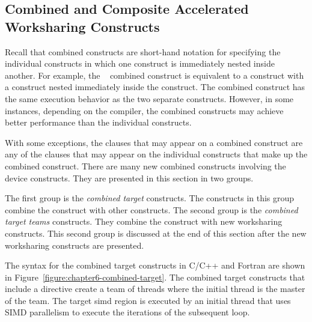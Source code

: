 \subsection{Combined and Composite Accelerated Worksharing Constructs}
\label{ssec:06.composite-worksharing-loop-construct}

Recall that combined constructs are short-hand notation for specifying the
individual constructs in which one construct is immediately nested inside another.
For example, the ~ combined construct is equivalent to
a  construct with a  construct nested immediately
inside the  construct.  The combined construct has the same
execution behavior as the two separate constructs.  However, in some instances,
depending on the compiler, the combined constructs may achieve better
performance than the individual constructs.

With some exceptions, the clauses that may appear on a combined
construct are any of the clauses that may appear on the individual
constructs that make up the combined construct.
There are many new combined
constructs involving the device constructs.  They are presented
in this section in two groups.  

The first group is the \emph{combined target} constructs.  The constructs in
this group combine the  construct with other constructs.
The second group is the \emph{combined target teams} constructs.  
They combine the  construct with new
worksharing constructs.  This second group is discussed at the end of this section
after the new worksharing constructs are presented.

The syntax for the combined target constructs in C/C++ and Fortran
are shown in Figure~\ref{figure:chapter6-combined-target}.  The combined
target constructs that include a  directive create a
team of threads where the initial thread is the master of the team.
The target simd region is executed by an initial thread that uses SIMD
parallelism to execute the iterations of the subsequent loop.

